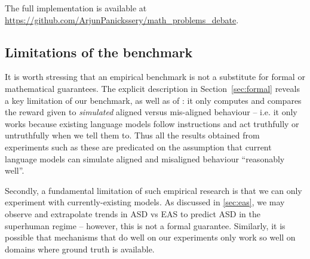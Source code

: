 The full implementation is available at \url{https://github.com/ArjunPanickssery/math_problems_debate}.

\subsection{Limitations of the benchmark}

It is worth stressing that an empirical benchmark is not a substitute for formal or mathematical guarantees. The explicit description in Section~\ref{sec:formal} reveals a key limitation of our benchmark, as well as of \previouswork{}: it only computes and compares the reward given to \emph{simulated} aligned versus mis-aligned behaviour -- i.e. it only works because existing language models follow instructions and act truthfully or untruthfully when we tell them to. Thus all the results obtained from experiments such as these are predicated on the assumption that current language models can simulate aligned and misaligned behaviour ``reasonably well''.%

Secondly, a fundamental limitation of such empirical research is that we can only experiment with currently-existing models. As discussed in \cref{sec:eas}, we may observe and extrapolate trends in ASD vs EAS to predict ASD in the superhuman regime -- however, this is not a formal guarantee. Similarly, it is possible that mechanisms that do well on our experiments only work so well on domains where ground truth is available.





